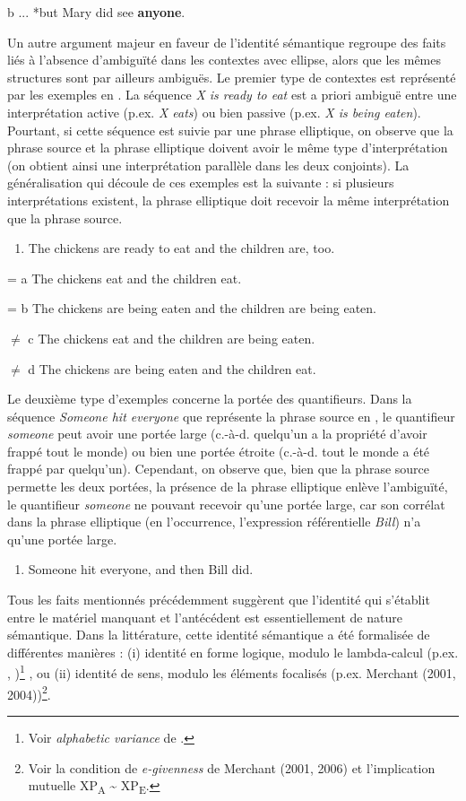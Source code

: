 b  ... *but Mary did see \textbf{anyone}.

Un autre argument majeur en faveur de l'identité sémantique regroupe des faits liés à l'absence d'ambiguïté dans les contextes avec ellipse, alors que les mêmes structures sont par ailleurs ambiguës. Le premier type de contextes est représenté par les exemples en . La séquence \textit{X is ready to eat} est a priori ambiguë entre une interprétation active (p.ex. \textit{X eats}) ou bien passive (p.ex. \textit{X is being eaten}). Pourtant, si cette séquence est suivie par une phrase elliptique, on observe que la phrase source et la phrase elliptique doivent avoir le même type d'interprétation (on obtient ainsi une interprétation parallèle dans les deux conjoints). La généralisation qui découle de ces exemples est la suivante : si plusieurs interprétations existent, la phrase elliptique doit recevoir la même interprétation que la phrase source.


\begin{enumerate}
\item \label{bkm:Ref306044733}The chickens are ready to eat and the children are, too.  


\end{enumerate}
=  a  The chickens eat and the children eat. 

=  b  The chickens are being eaten and the children are being eaten.

${\neq}$  c  The chickens eat and the children are being eaten.

${\neq}$  d  The chickens are being eaten and the children eat.

Le deuxième type d'exemples concerne la portée des quantifieurs. Dans la séquence \textit{Someone hit everyone} que représente la phrase source en , le quantifieur \textit{someone} peut avoir une portée large (c.-à-d. quelqu'un a la propriété d'avoir frappé tout le monde) ou bien une portée étroite (c.-à-d. tout le monde a été frappé par quelqu'un). Cependant, on observe que, bien que la phrase source permette les deux portées, la présence de la phrase elliptique enlève l'ambiguïté, le quantifieur \textit{someone} ne pouvant recevoir qu'une portée large, car son corrélat dans la phrase elliptique (en l'occurrence, l'expression référentielle \textit{Bill}) n'a qu'une portée large.


\begin{enumerate}
\item \label{bkm:Ref306045272}Someone hit everyone, and then Bill did. 


\end{enumerate}
Tous les faits mentionnés précédemment suggèrent que l'identité qui s'établit entre le matériel manquant et l'antécédent est essentiellement de nature sémantique. Dans la littérature, cette identité sémantique a été formalisée de différentes manières : (i) identité en forme logique, modulo le lambda-calcul (p.ex. \citet{Sag1976}, \citet{William1977})\footnote{Voir \textit{alphabetic variance} de \citet{Sag1976}.} , ou (ii) identité de sens, modulo les éléments focalisés (p.ex. Merchant (2001, 2004))\footnote{Voir la condition de \textit{e-givenness} de Merchant (2001, 2006) et l'implication mutuelle XP\textsubscript{A} \~{} XP\textsubscript{E}.}.~

